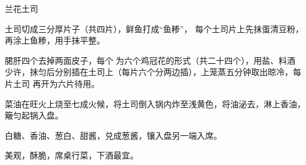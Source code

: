 \begin{recipe}{兰花土司}

\ingredients


\preparation

\step 土司切成三分厚片子（共四片），鲜鱼打成“鱼糁”， 每个土司片上先抹蛋清豆粉，
再涂上鱼糁，用手抹平整。

\step 𬂁肝四个去掉两面皮子，每个𠟤为六个鸡冠花的形式（共二十四个），用盐、料酒
少许，抹匀后分别插在土司上（每片六个分两边插），上笼蒸五分钟取出晾冷，每片土司
再开为六片待用。

\step 菜油在旺火上烧至七成火候，将土司倒入锅内炸至浅黄色，将油泌去，淋上香油，
簸匀起锅入盘。

\step 白糖、香油、葱白、甜酱，兑成葱酱，镶入盘另一端入席。

\features

美观，酥脆，席桌行菜，下酒最宜。

\end{recipe}

